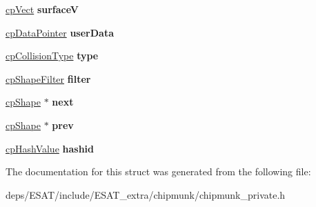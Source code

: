 \begin{DoxyCompactItemize}
\item 
\mbox{\label{structcp_shape_a462e22e2a9f67af774e965f9931c8538}} 
\mbox{\hyperlink{structcp_vect}{cp\+Vect}} {\bfseries surfaceV}
\item 
\mbox{\label{structcp_shape_a8e8ca2f3736f917d06a88b9f648f5e4c}} 
\mbox{\hyperlink{group__basic_types_ga2ac2c3c31e21893941f9e4f8ee279447}{cp\+Data\+Pointer}} {\bfseries user\+Data}
\item 
\mbox{\label{structcp_shape_abae1c01e2b8c70cb15bf313816c8af60}} 
\mbox{\hyperlink{group__basic_types_gae83e2f50965eb441e36ffff1e32e6d02}{cp\+Collision\+Type}} {\bfseries type}
\item 
\mbox{\label{structcp_shape_a2a5150b1f512b355038355b46c447ae7}} 
\mbox{\hyperlink{structcp_shape_filter}{cp\+Shape\+Filter}} {\bfseries filter}
\item 
\mbox{\label{structcp_shape_ad8efb848853d473bf2af4618baa1838b}} 
\mbox{\hyperlink{structcp_shape}{cp\+Shape}} $\ast$ {\bfseries next}
\item 
\mbox{\label{structcp_shape_a01dcf453d94fef71ac8f792c3693fa98}} 
\mbox{\hyperlink{structcp_shape}{cp\+Shape}} $\ast$ {\bfseries prev}
\item 
\mbox{\label{structcp_shape_a98ce6465c208b0e053a4606bcb7e26c4}} 
\mbox{\hyperlink{group__basic_types_gae7eb4775a9f43914a15553ca65a048f4}{cp\+Hash\+Value}} {\bfseries hashid}
\end{DoxyCompactItemize}


The documentation for this struct was generated from the following file\+:\begin{DoxyCompactItemize}
\item 
deps/\+E\+S\+A\+T/include/\+E\+S\+A\+T\+\_\+extra/chipmunk/chipmunk\+\_\+private.\+h\end{DoxyCompactItemize}
